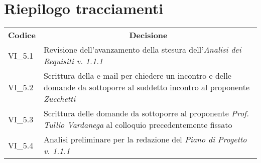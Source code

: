 
\section{Riepilogo tracciamenti}
\begin{longtable} {
		>{\centering}p{17mm} 
		>{}p{120mm}}
	\rowcolor{gray!50}
	\textbf{Codice} & \multicolumn{1}{c}{\textbf{Decisione}} \\%
	VI\_5.1 & Revisione dell'avanzamento della stesura dell'\textit{Analisi dei Requisiti v. 1.1.1} \TBstrut \\ [2mm]
	VI\_5.2 & Scrittura della e-mail per chiedere un incontro e delle domande da sottoporre al suddetto incontro al proponente \textit{Zucchetti} \TBstrut \\ [2mm]
	VI\_5.3 & Scrittura delle domande da sottoporre al proponente \textit{Prof. Tullio Vardanega} al colloquio precedentemente fissato \TBstrut \\ [2mm]
	VI\_5.4 & Analisi preliminare per la redazione del \textit{Piano di Progetto v. 1.1.1} \TBstrut \\ [2mm]
	
\end{longtable}